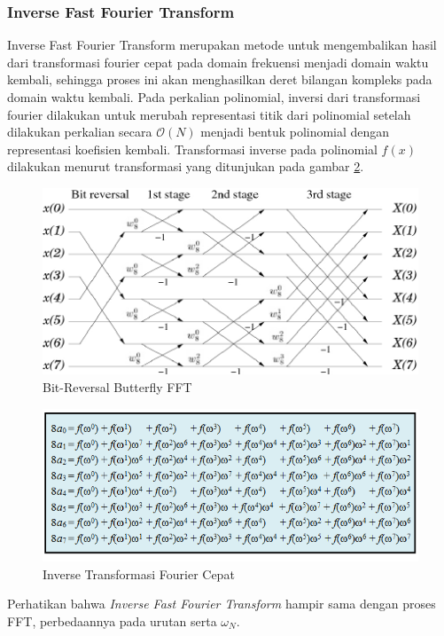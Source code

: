 \subsubsection{ Inverse Fast Fourier Transform} Inverse Fast Fourier Transform merupakan metode untuk mengembalikan hasil dari transformasi fourier cepat pada domain frekuensi menjadi domain waktu kembali, sehingga proses ini akan menghasilkan deret bilangan kompleks pada domain waktu kembali. Pada perkalian polinomial, inversi dari transformasi fourier dilakukan untuk merubah representasi titik dari polinomial setelah dilakukan perkalian secara $ \mathcal{O}{(N)} $ menjadi bentuk polinomial dengan representasi koefisien kembali. Transformasi inverse pada polinomial $ f(x) $ dilakukan menurut transformasi yang ditunjukan pada gambar \ref{fig:inverse-fft}.
\begin{figure}
	\Centering
	\includegraphics [scale=0.7]{bab2/img/bit-reverse-fft-butterfly}
	\caption {Bit-Reversal Butterfly FFT}
	\label {fig:bit-reverse-fft-butterfly}
\end{figure}

\begin{figure}
	\Centering
	\includegraphics [scale=0.6]{bab2/img/inverse-fft}
	\caption {Inverse Transformasi Fourier Cepat}
	\label {fig:inverse-fft}
\end{figure}
Perhatikan bahwa \textit{Inverse Fast Fourier Transform} hampir sama dengan proses FFT, perbedaannya pada urutan serta $ \omega_N $.


